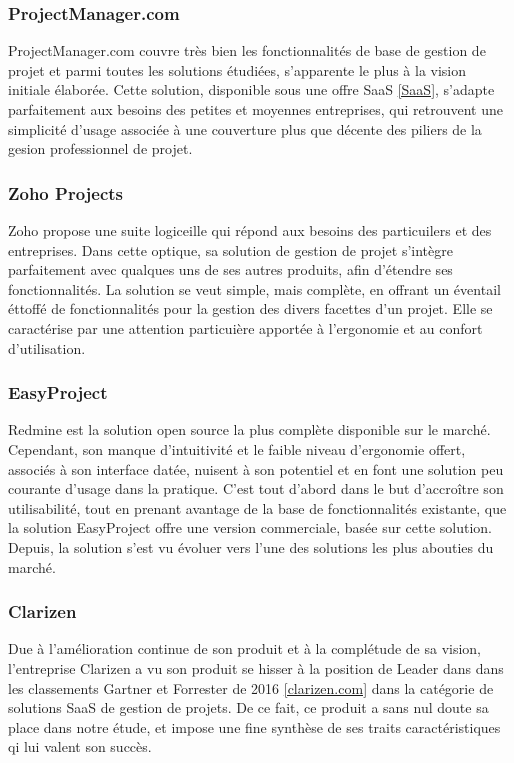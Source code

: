 \begin{spacing}{1.5}
\subsubsection*{ProjectManager.com} %
ProjectManager.com couvre très bien les fonctionnalités de base de gestion de projet et parmi toutes les solutions étudiées, s'apparente le plus à la vision initiale élaborée. Cette solution, disponible sous une offre SaaS \ref{SaaS}, s'adapte parfaitement aux besoins des petites et moyennes entreprises, qui retrouvent une simplicité d'usage associée à une couverture plus que décente des piliers de la gesion professionnel de projet.

\subsubsection*{Zoho Projects} %
Zoho propose une suite logiceille qui répond aux besoins des particuilers et des entreprises. Dans cette optique, sa solution de gestion de projet s'intègre parfaitement avec qualques uns de ses autres produits, afin d'étendre ses fonctionnalités. La solution se veut simple, mais complète, en offrant un éventail éttoffé de fonctionnalités pour la gestion des divers facettes d'un projet. Elle se caractérise par une attention particuière apportée à l'ergonomie et au confort d'utilisation.

\subsubsection*{EasyProject} %
Redmine est la solution open source la plus complète disponible sur le marché. Cependant, son manque d'intuitivité et le faible niveau d'ergonomie offert, associés à son interface datée, nuisent à son potentiel et en font une solution peu courante d'usage dans la pratique. C'est tout d'abord dans le but d'accroître son utilisabilité, tout en prenant avantage de la base de fonctionnalités existante, que la solution EasyProject offre une version commerciale, basée sur cette solution. Depuis, la solution s'est vu évoluer vers l'une des solutions les plus abouties du marché.

\subsubsection*{Clarizen} %
Due à l'amélioration continue de son produit et à la complétude de sa vision, l'entreprise Clarizen a vu son produit se hisser à la position de Leader dans dans les classements Gartner et Forrester de 2016 \ref{clarizen.com} dans la catégorie de solutions SaaS de gestion de projets. De ce fait, ce produit a sans nul doute sa place dans notre étude, et impose une fine synthèse de ses traits caractéristiques qi lui valent son succès.
\\


\end{spacing}
